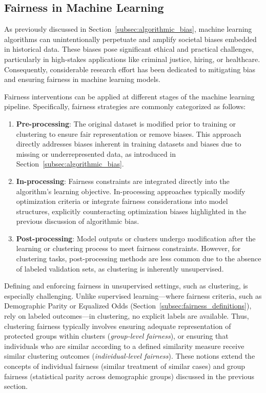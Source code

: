 \subsection{Fairness in Machine Learning}
As previously discussed in Section~\ref{subsec:algorithmic_bias},
machine learning algorithms can unintentionally perpetuate and
amplify societal biases embedded in historical data. These biases
pose significant ethical and practical challenges, particularly in
high-stakes applications like criminal justice, hiring, or
healthcare. Consequently, considerable research effort has been
dedicated to mitigating bias and ensuring fairness in machine learning models.

Fairness interventions can be applied at different stages of the
machine learning pipeline. Specifically, fairness strategies are
commonly categorized as follows:

\begin{enumerate}
  \item \textbf{Pre-processing}: The original dataset is modified
    prior to training or clustering to ensure fair representation or
    remove biases. This approach directly addresses biases inherent
    in training datasets and biases due to missing or
    underrepresented data, as introduced in
    Section~\ref{subsec:algorithmic_bias}.

  \item \textbf{In-processing}: Fairness constraints are integrated
    directly into the algorithm's learning objective. In-processing
    approaches typically modify optimization criteria or integrate
    fairness considerations into model structures, explicitly
    counteracting optimization biases highlighted in the previous
    discussion of algorithmic bias.

  \item \textbf{Post-processing}: Model outputs or clusters undergo
    modification after the learning or clustering process to meet
    fairness constraints. However, for clustering tasks,
    post-processing methods are less common due to the absence of
    labeled validation sets, as clustering is inherently unsupervised.
\end{enumerate}

Defining and enforcing fairness in unsupervised settings, such as
clustering, is especially challenging. Unlike supervised
learning—where fairness criteria, such as Demographic Parity or
Equalized Odds (Section~\ref{subsec:fairness_definitions}), rely on
labeled outcomes—in clustering, no explicit labels are available.
Thus, clustering fairness typically involves ensuring adequate
representation of protected groups within clusters
(\textit{group-level fairness}), or ensuring that individuals who are
similar according to a defined similarity measure receive similar
clustering outcomes (\textit{individual-level fairness}). These
notions extend the concepts of individual fairness (similar treatment
of similar cases) and group fairness (statistical parity across
demographic groups) discussed in the previous section.

